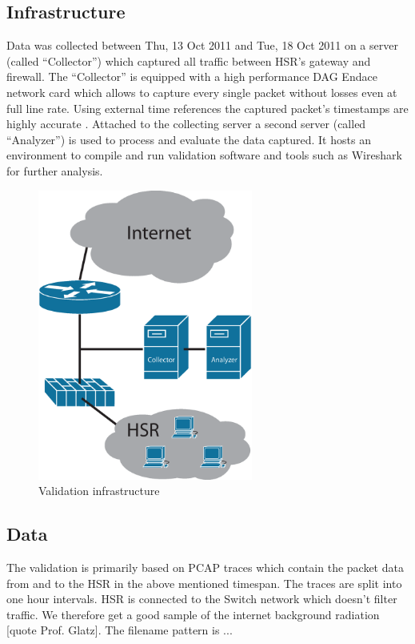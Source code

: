 \documentclass[a4paper]{scrartcl}
\begin{document}
\subsection{Infrastructure}
Data was collected between Thu, 13 Oct 2011 and Tue, 18 Oct 2011 on a server (called ``Collector'') which captured all traffic between HSR's gateway and firewall.  The ``Collector'' is equipped with a high performance DAG Endace network card which allows to capture every single packet without losses even at full line rate. Using external time references the captured packet's timestamps are highly accurate \cite{endace}. Attached to the collecting server a second server (called ``Analyzer'') is used to process and evaluate the data captured. It hosts an environment to compile and run validation software and tools such as Wireshark for further analysis.
\begin{figure}[ht]
	\begin{center}
		\includegraphics[width=200pt, keepaspectratio=true]{Bilder/Infrastruktur.eps}
		\caption{Validation infrastructure}
		\label{infra}
	\end{center}
\end{figure}

\subsection{Data}
The validation is primarily based on PCAP traces which contain the packet data from and to the HSR in the above mentioned timespan. The traces are split into one hour intervals. HSR is connected to the Switch network which doesn't filter traffic. We therefore get a good sample of the internet background radiation [quote Prof. Glatz]. The filename pattern is ...
\end{document}
